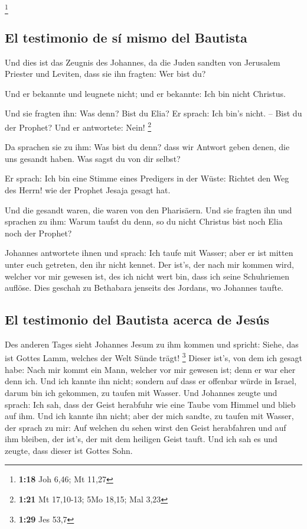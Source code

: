 \footnote{\textbf{1:18} Joh 6,46; Mt 11,27}

\hypertarget{el-testimonio-de-suxed-mismo-del-bautista}{%
\subsection{El testimonio de sí mismo del
Bautista}\label{el-testimonio-de-suxed-mismo-del-bautista}}

 Und dies ist das Zeugnis des Johannes, da die Juden
sandten von Jerusalem Priester und Leviten, dass sie ihn fragten: Wer
bist du?

 Und er bekannte und leugnete nicht; und er bekannte: Ich
bin nicht Christus.

 Und sie fragten ihn: Was denn? Bist du Elia? Er sprach:
Ich bin's nicht. -- Bist du der Prophet? Und er antwortete: Nein!
\footnote{\textbf{1:21} Mt 17,10-13; 5Mo 18,15; Mal 3,23}

 Da sprachen sie zu ihm: Was bist du denn? dass wir
Antwort geben denen, die uns gesandt haben. Was sagst du von dir selbst?

 Er sprach: Ich bin eine Stimme eines Predigers in der
Wüste: Richtet den Weg des Herrn! wie der Prophet Jesaja gesagt hat.

 Und die gesandt waren, die waren von den Pharisäern.
 Und sie fragten ihn und sprachen zu ihm: Warum taufst du
denn, so du nicht Christus bist noch Elia noch der Prophet?

 Johannes antwortete ihnen und sprach: Ich taufe mit
Wasser; aber er ist mitten unter euch getreten, den ihr nicht kennet.
 Der ist's, der nach mir kommen wird, welcher vor mir
gewesen ist, des ich nicht wert bin, dass ich seine Schuhriemen auflöse.
 Dies geschah zu Bethabara jenseits des Jordans, wo
Johannes taufte.

\hypertarget{el-testimonio-del-bautista-acerca-de-jesuxfas}{%
\subsection{El testimonio del Bautista acerca de
Jesús}\label{el-testimonio-del-bautista-acerca-de-jesuxfas}}

 Des anderen Tages sieht Johannes Jesum zu ihm kommen und
spricht: Siehe, das ist Gottes Lamm, welches der Welt Sünde trägt!
\footnote{\textbf{1:29} Jes 53,7}  Dieser ist's, von dem
ich gesagt habe: Nach mir kommt ein Mann, welcher vor mir gewesen ist;
denn er war eher denn ich.  Und ich kannte ihn nicht;
sondern auf dass er offenbar würde in Israel, darum bin ich gekommen, zu
taufen mit Wasser.  Und Johannes zeugte und sprach: Ich
sah, dass der Geist herabfuhr wie eine Taube vom Himmel und blieb auf
ihm.  Und ich kannte ihn nicht; aber der mich sandte, zu
taufen mit Wasser, der sprach zu mir: Auf welchen du sehen wirst den
Geist herabfahren und auf ihm bleiben, der ist's, der mit dem heiligen
Geist tauft.  Und ich sah es und zeugte, dass dieser ist
Gottes Sohn.

